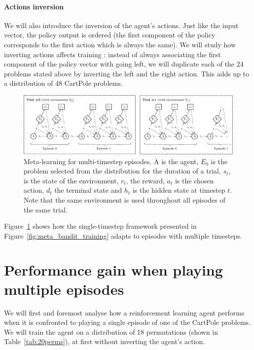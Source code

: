 \paragraph{Actions inversion} We will also introduce the inversion of the
agent's actions. Just like the input vector, the policy output is ordered
(the first component of the policy corresponds to the first action which is
always the same). We will study how inverting actions affects training : instead
of always associating the first component of the policy vector with going left,
we will duplicate each of the 24 problems stated above by inverting the left
and the right action. This adds up to a distribution of 48 CartPole problems.\\

\begin{figure}
	\centering
	\includegraphics[width=\linewidth]{fig/meta_cartpole.eps}
	\caption{Meta-learning for multi-timestep episodes. A is the agent,
	$E_0$ is the problem selected from the distribution for the duration
	of a trial, $s_t$, is the state of the environment, $r_t$, the reward,
	$a_t$ is the chosen action, $d_t$ the terminal state and $h_t$ is
	the hidden state at timestep $t$. Note that the same environment is
	used throughout all episodes of the same trial.}
	\label{fig:meta_cartpole}
\end{figure}

Figure~\ref{fig:meta_cartpole} shows how the single-timestep framework
presented in Figure~\ref{fig:meta_bandit_training} adapts to episodes
with multiple timesteps.

\section{Performance gain when playing multiple episodes}

We will first and foremost analyse how a reinforcement learning agent 
performs when it is confronted to playing a single episode of one of the 
CartPole problems. We will train the agent on a distribution of 18 permutations
(shown in Table~\ref{tab:20perms}), at first without inverting the agent's
action.\\


